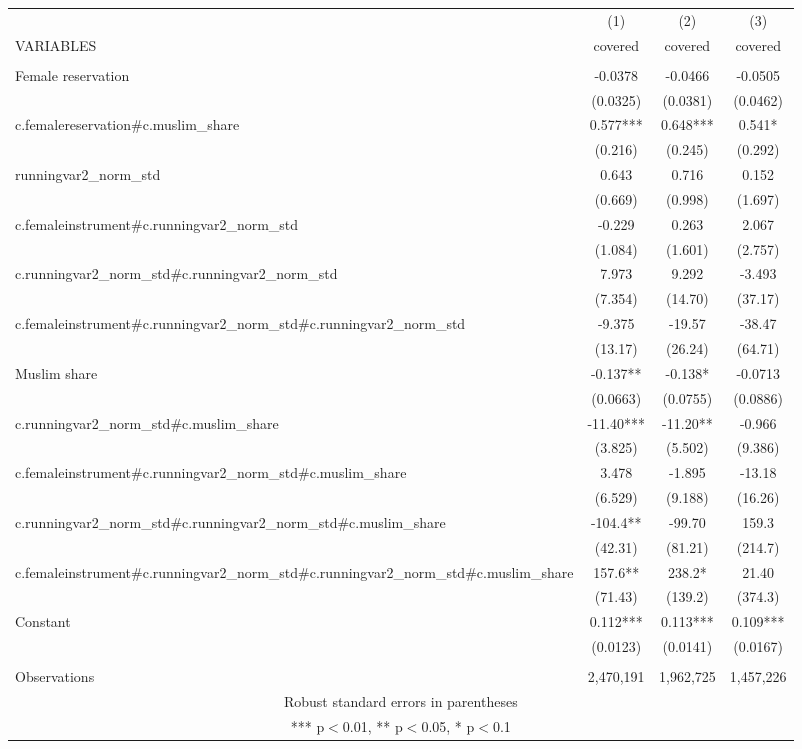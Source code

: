 \begin{tabular}{lccc} \hline
 & (1) & (2) & (3) \\
VARIABLES & covered & covered & covered \\ \hline
 &  &  &  \\
Female reservation & -0.0378 & -0.0466 & -0.0505 \\
 & (0.0325) & (0.0381) & (0.0462) \\
c.femalereservation\#c.muslim\_share & 0.577*** & 0.648*** & 0.541* \\
 & (0.216) & (0.245) & (0.292) \\
runningvar2\_norm\_std & 0.643 & 0.716 & 0.152 \\
 & (0.669) & (0.998) & (1.697) \\
c.femaleinstrument\#c.runningvar2\_norm\_std & -0.229 & 0.263 & 2.067 \\
 & (1.084) & (1.601) & (2.757) \\
c.runningvar2\_norm\_std\#c.runningvar2\_norm\_std & 7.973 & 9.292 & -3.493 \\
 & (7.354) & (14.70) & (37.17) \\
c.femaleinstrument\#c.runningvar2\_norm\_std\#c.runningvar2\_norm\_std & -9.375 & -19.57 & -38.47 \\
 & (13.17) & (26.24) & (64.71) \\
Muslim share & -0.137** & -0.138* & -0.0713 \\
 & (0.0663) & (0.0755) & (0.0886) \\
c.runningvar2\_norm\_std\#c.muslim\_share & -11.40*** & -11.20** & -0.966 \\
 & (3.825) & (5.502) & (9.386) \\
c.femaleinstrument\#c.runningvar2\_norm\_std\#c.muslim\_share & 3.478 & -1.895 & -13.18 \\
 & (6.529) & (9.188) & (16.26) \\
c.runningvar2\_norm\_std\#c.runningvar2\_norm\_std\#c.muslim\_share & -104.4** & -99.70 & 159.3 \\
 & (42.31) & (81.21) & (214.7) \\
c.femaleinstrument\#c.runningvar2\_norm\_std\#c.runningvar2\_norm\_std\#c.muslim\_share & 157.6** & 238.2* & 21.40 \\
 & (71.43) & (139.2) & (374.3) \\
Constant & 0.112*** & 0.113*** & 0.109*** \\
 & (0.0123) & (0.0141) & (0.0167) \\
 &  &  &  \\
 Observations & 2,470,191 & 1,962,725 & 1,457,226 \\ \hline
\multicolumn{4}{c}{ Robust standard errors in parentheses} \\
\multicolumn{4}{c}{ *** p$<$0.01, ** p$<$0.05, * p$<$0.1} \\
\end{tabular}
